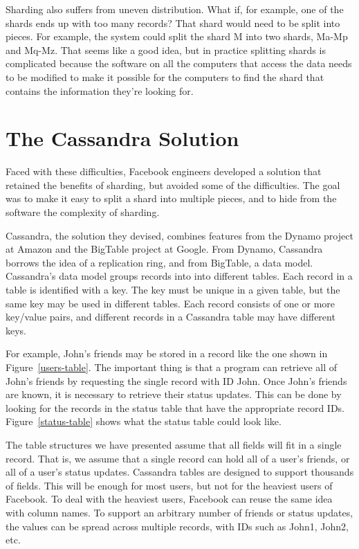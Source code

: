 Sharding also suffers from uneven distribution.
What if, for example, one of the shards ends up with too many records?
That shard would need to be split into pieces.
For example, the system could
split the shard M into two shards, Ma-Mp and Mq-Mz.
That seems like a good idea, but in practice splitting shards
is complicated because the software on all the computers that access the data
needs to be modified to make it possible for the computers
to find the shard that contains the information they're looking for.

\section{The Cassandra Solution}

Faced with these difficulties, Facebook engineers developed a solution that
retained the benefits of sharding, but avoided some of the difficulties.
The goal was to make it easy to split a shard into multiple pieces,
and to hide from the software the complexity of sharding.

Cassandra, the solution they devised, combines features
from the Dynamo project at Amazon and the BigTable project at Google.
From Dynamo, Cassandra borrows the idea of a replication ring,
and from BigTable, a data model.
Cassandra's data model groups records into into different tables.
Each record in a table is identified with a key.
The key must be unique in a given table, 
but the same key may be used in different tables.
Each record consists of one or more key/value pairs, and
different records in a Cassandra table may have different keys.

For example, John's friends may be stored in a record like the one shown in Figure~\ref{users-table}.
The important thing is that a program can retrieve
all of John's friends by requesting the single record with ID John.
Once John's friends are known, it is necessary to retrieve their status updates.
This can be done by looking for the records in the status table that have the appropriate record IDs.
Figure~\ref{status-table} shows what the status table could look like.

The table structures we have presented assume that all fields will fit in a single record.
That is, we assume that a single record can hold all of a user's friends, or all of a user's status updates.
Cassandra tables are designed to support thousands of fields.
This will be enough for most users, but not for the heaviest users of Facebook.
To deal with the heaviest users, Facebook can reuse the same idea with column names.
To support an arbitrary number of friends or status updates,
the values can be spread across multiple records, with IDs such as John1, John2, etc.

